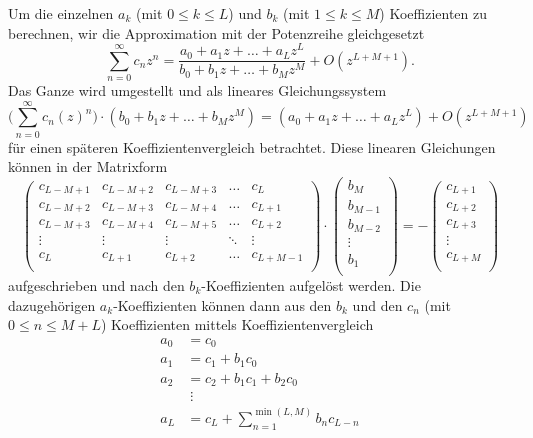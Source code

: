 Um die einzelnen $a_k$ (mit $0\leq k\leq L$) und $b_k$ (mit $1\leq k\leq M $) Koeffizienten zu berechnen, wir die Approximation mit der Potenzreihe gleichgesetzt
\begin{equation}
\sum_{n=0}^{\infty} c_{n} z^{n} 
=
\frac{a_0 + a_1 z + \dots + a_L z^L}{b_0 + b_1 z + \dots + b_M z^M}
+O(z^{L+M+1}).
\end{equation}
Das Ganze wird umgestellt und als lineares Gleichungssystem
\begin{equation}
\biggl(
\sum_{n=0}^{\infty} c_{n} (z)^{n} 
\biggr)
\cdot
(b_0 + b_1 z + \dots + b_M z^M)
=
(a_0 + a_1 z + \dots + a_L z^L) 
+
O(z^{L+M+1})
\end{equation}
für einen späteren Koeffizientenvergleich betrachtet.
Diese linearen Gleichungen können in der Matrixform 
\[
\renewcommand\arraystretch{1.25}
\begin{pmatrix}
c_{L-M+1} & c_{L-M+2} & c_{L-M+3} &\dots & c_{L}\\
c_{L-M+2} & c_{L-M+3} & c_{L-M+4} &\dots & c_{L+1}\\
c_{L-M+3} & c_{L-M+4} & c_{L-M+5} &\dots & c_{L+2}\\
\vdots & \vdots  & \vdots  &\ddots  & \vdots \\
c_{L} & c_{L+1} & c_{L+2} &\dots & c_{L+M-1}\\
\end{pmatrix}
\cdot
\begin{pmatrix}
b_{M}\\
b_{M-1}\\
b_{M-2}\\
\vdots \\
b_{1}\\
\end{pmatrix}
=
-
\begin{pmatrix}
c_{L+1}\\
c_{L+2}\\
c_{L+3}\\
\vdots \\
c_{L+M}\\
\end{pmatrix}
\label{pade:bKoeff}
\]
aufgeschrieben und nach den $b_k$-Koeffizienten aufgelöst werden.
Die dazugehörigen $a_k$-Koeffizienten können dann aus den $b_k$ und den $c_n$ (mit $0\leq n \leq M+L$) Koeffizienten mittels Koeffizientenvergleich
\begin{equation}
\begin{aligned}
a_{0}&=c_{0} \\
a_{1}&=c_{1}+b_{1} c_{0} \\
a_{2}&=c_{2}+b_{1} c_{1}+b_{2} c_{0} \\
&\;\vdots \\
a_{L}&=c_{L}+\displaystyle\sum_{n=1}^{\min (L, M)} b_{n} c_{L-n}
\end{aligned}
\label{pade:aKoeff}
\end{equation}
